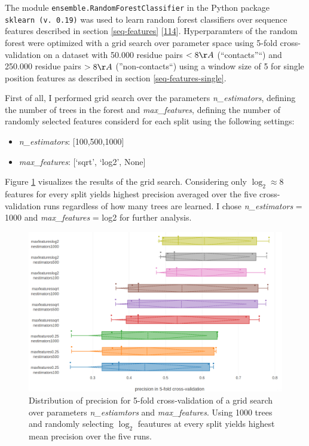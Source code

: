 \documentclass[12pt,a4paper,twoside]{book}
\providecommand{\tightlist}{%
  \setlength{\itemsep}{0pt}\setlength{\parskip}{0pt}}
\theoremstyle{definition}
\theoremstyle{definition}
\theoremstyle{remark}
\begin{document}
The module \texttt{ensemble.RandomForestClassifier} in the Python
package \texttt{sklearn\ (v.\ 0.19)} was used to learn random forest
classifiers over sequence features described in section
\ref{seq-features} {[}\protect\hyperlink{ref-Pedregosa2011}{114}{]}.
Hyperparamters of the random forest were optimized with a grid search
over parameter space using 5-fold cross-validation on a dataset with
50.000 residue pairs \(< 8 \AA\) (``contacts''``) and 250.000 residue
pairs \(> 8 \AA\) (''non-contacts``) using a window size of 5 for single
position features as described in section \ref{seq-features-single}.

First of all, I performed grid search over the parameters
\emph{n\_estimators}, defining the number of trees in the forest and
\emph{max\_features}, defining the number of randomly selected features
considerd for each split using the following settings:

\begin{itemize}
\tightlist
\item
  \emph{n\_estimators}: {[}100,500,1000{]}
\item
  \emph{max\_features}: {[}`sqrt', `log2', None{]}
\end{itemize}

Figure \ref{fig:rf-gridsearch-nestimators-maxfeatures} visualizes the
results of the grid search. Considering only \(\log_2 \approx 8\)
features for every split yields highest precision averaged over the five
cross-validation runs regardless of how many trees are learned. I chose
\emph{n\_estimators} = 1000 and \emph{max\_features} = log2 for further
analysis.







\begin{figure}

{\centering \includegraphics[width=0.9\linewidth]{img/random_forest_contact_prior/gridsearch/grid_search_cv_results_precision_random_forest_notitle_nrestimators_maxfeatures} 

}

\caption{Distribution of
precision for 5-fold cross-validation of a grid search over parameters
\emph{n\_estiamtors} and \emph{max\_features}. Using 1000 trees and
randomly selecting \(\log_2\) feautures at every split yields highest
mean precision over the five runs.}\label{fig:rf-gridsearch-nestimators-maxfeatures}
\end{figure}
\end{document}
